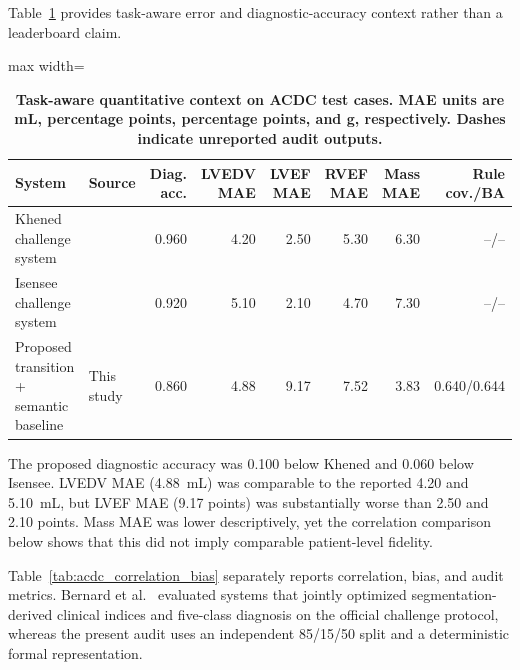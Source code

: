 \documentclass{ceurart}
\begin{document}
Table~\ref{tab:acdc_sota_comparison} provides task-aware error and diagnostic-accuracy context rather than a leaderboard claim.

\begin{table}[!htbp]
\caption{\textbf{Task-aware quantitative context on ACDC test cases. MAE units are mL, percentage points, percentage points, and g, respectively. Dashes indicate unreported audit outputs.}}
\label{tab:acdc_sota_comparison}
\centering
\footnotesize
\begin{adjustbox}{max width=\linewidth}
\begin{tabular}{llrrrrrr}
\toprule
System & Source & Diag. acc. & LVEDV MAE & LVEF MAE & RVEF MAE & Mass MAE & Rule cov./BA \\
\midrule
Khened challenge system & \cite{Bernard2018Deep} & 0.960 & 4.20 & 2.50 & 5.30 & 6.30 & --/-- \\
Isensee challenge system & \cite{Bernard2018Deep} & 0.920 & 5.10 & 2.10 & 4.70 & 7.30 & --/-- \\
Proposed transition + semantic baseline & This study & 0.860 & 4.88 & 9.17 & 7.52 & 3.83 & 0.640/0.644 \\
\bottomrule
\end{tabular}
\end{adjustbox}
\end{table}

The proposed diagnostic accuracy was 0.100 below Khened and 0.060 below Isensee. LVEDV MAE (4.88~mL) was comparable to the reported 4.20 and 5.10~mL, but LVEF MAE (9.17 points) was substantially worse than 2.50 and 2.10 points. Mass MAE was lower descriptively, yet the correlation comparison below shows that this did not imply comparable patient-level fidelity.

Table~\ref{tab:acdc_correlation_bias} separately reports correlation, bias, and audit metrics. Bernard et al.~\cite{Bernard2018Deep} evaluated systems that jointly optimized segmentation-derived clinical indices and five-class diagnosis on the official challenge protocol, whereas the present audit uses an independent 85/15/50 split and a deterministic formal representation.
\end{document}
